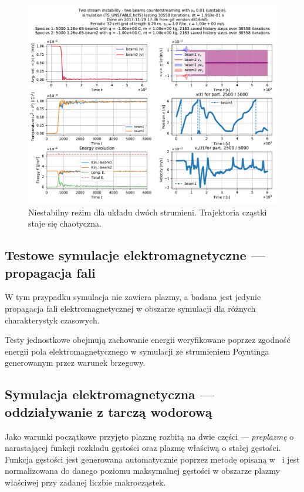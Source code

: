 \begin{figure}[h!]
  \includegraphics[width=\textwidth]{Images/TS_UNSTABLE}
  \caption{Niestabilny reżim dla układu dwóch strumieni. Trajektoria cząstki staje się chaotyczna.\label{fig:twostream-unstable}}
\end{figure}

\subsection{Testowe symulacje elektromagnetyczne --- propagacja fali}
W tym przypadku symulacja nie zawiera plazmy, a badana jest jedynie propagacja fali elektromagnetycznej w obszarze
symulacji dla różnych charakterystyk czasowych. 

Testy jednostkowe obejmują zachowanie energii weryfikowane poprzez zgodność
energii pola elektromagnetycznego w symulacji ze strumieniem Poyntinga generowanym
przez warunek brzegowy. %


\subsection{Symulacja elektromagnetyczna --- oddziaływanie z tarczą wodorową}

Jako warunki początkowe przyjęto plazmę rozbitą na dwie części ---
\emph{preplazmę} o narastającej funkcji rozkładu gęstości oraz plazmę właściwą
o stałej gęstości. Funkcja gęstości jest generowana automatycznie poprzez
metodę opisaną w~\cite{birdsall} i jest normalizowana do danego poziomu
maksymalnej gęstości w obszarze plazmy właściwej przy zadanej liczbie
makrocząstek.

